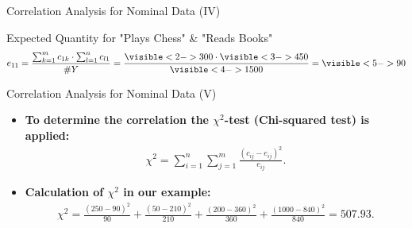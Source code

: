 \begin{frame}{Correlation Analysis for Nominal Data (IV)}
\begin{itemize}
		      \begin{block}{Expected Quantity for "Plays Chess" \& "Reads Books"}
			      \vspace{-7mm}
			      \begin{align*}
				      e_{11} = \frac{\sum_{k=1}^{m} c_{1k} \cdot \sum_{l=1}^{n}c_{l1}}{\#Y} = \frac{\visible<2->{300} \cdot \visible<3->{450}}{\visible<4->{1500}} = \visible<5->{90}
			      \end{align*}
			      \vspace{-5mm}
		      \end{block}
	\end{itemize}
\end{frame}

\begin{frame}{Correlation Analysis for Nominal Data (V)}
	\begin{itemize}
		\item \textbf{To determine the correlation the
				      {\color{airforceblue}$\chi^2$-test} (Chi-squared test) is
			      applied:}
		      \begin{align*}
			      \chi^2 = \sum_{i=1}^{n}\sum_{j=1}^{m}
			      \frac{(c_{ij}-e_{ij})^2}{e_{ij}}.
		      \end{align*}

		\item \textbf{Calculation of $\chi^2$ in our example:}
		      \begin{align*}
			      \chi^2 = \frac{(250-90)^2}{90} + \frac{(50-210)^2}{210} +
			      \frac{(200-360)^2}{360} + \frac{(1000-840)^2}{840} = 507.93.
		      \end{align*}


	\end{itemize}
\end{frame}

